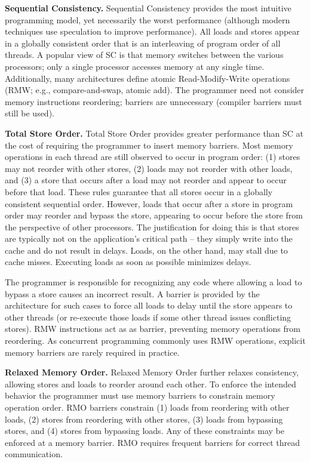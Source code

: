 \textbf{Sequential Consistency.}
Sequential Consistency \cite{Lamport79} provides the most intuitive programming model, yet necessarily the worst performance (although modern techniques use speculation to improve performance).
All loads and stores appear in a globally consistent order that is an interleaving of program order of all threads.
A popular view of SC is that memory switches between the various processors; only a single processor accesses memory at any single time.
Additionally, many architectures define atomic Read-Modify-Write operations (RMW; e.g., compare-and-swap, atomic add).
The programmer need not consider memory instructions reordering; barriers are unnecessary (compiler barriers must still be used).

\textbf{Total Store Order.}
Total Store Order \cite{SPARCv9} provides greater performance than SC at the cost of requiring the programmer to insert memory barriers.
Most memory operations in each thread are still observed to occur in program order: (1) stores may not reorder with other stores, (2) loads may not reorder with other loads, and (3) a store that occurs after a load may not reorder and appear to occur before that load.
These rules guarantee that all stores occur in a globally consistent sequential order.
However, loads that occur after a store in program order may reorder and bypass the store, appearing to occur before the store from the perspective of other processors.
The justification for doing this is that stores are typically not on the application's critical path -- they simply write into the cache and do not result in delays.
Loads, on the other hand, may stall due to cache misses.
Executing loads as soon as possible minimizes delays.

The programmer is responsible for recognizing any code where allowing a load to bypass a store causes an incorrect result.
A barrier is provided by the architecture for such cases to force all loads to delay until the store appears to other threads (or re-execute those loads if some other thread issues conflicting stores).
RMW instructions act as as barrier, preventing memory operations from reordering.
As concurrent programming commonly uses RMW operations, explicit memory barriers are rarely required in practice.

\textbf{Relaxed Memory Order.}
Relaxed Memory Order \cite{SPARCv9} further relaxes consistency, allowing stores and loads to reorder around each other.
To enforce the intended behavior the programmer must use memory barriers to constrain memory operation order.
RMO barriers constrain (1) loads from reordering with other loads, (2) stores from reordering with other stores, (3) loads from bypassing stores, and (4) stores from bypassing loads.
Any of these constraints may be enforced at a memory barrier.
RMO requires frequent barriers for correct thread communication.

